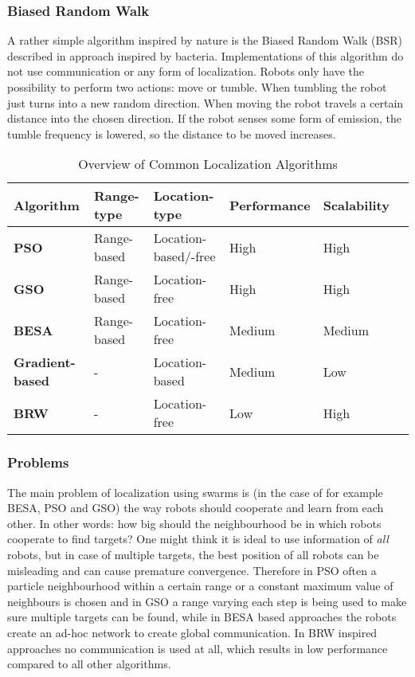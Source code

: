 	\subsubsection{Biased Random Walk}
		A rather simple algorithm inspired by nature is the Biased Random Walk (BSR) described in \cite{dhariwal2004bacterium} approach inspired by bacteria. 
		Implementations of this algorithm do not use communication or any form of localization. 
		Robots only have the possibility to perform two actions: move or tumble. 
		When tumbling the robot just turns into a new random direction. 
		When moving the robot travels a certain distance into the chosen direction. 
		If the robot senses some form of emission, the tumble frequency is lowered, so the distance to be moved increases.

	\begin{table}[H]
  \renewcommand{\arraystretch}{1.3}
  \caption{Overview of Common Localization Algorithms}
  \label{table_alg_localization}
  \centering
    \begin{tabular}{|l|l|l|l|l|l|}
    \hline
    \bfseries Algorithm & Range-type & Location-type & Performance & Scalability\\
    \hline
    \bfseries PSO & Range-based & Location-based/-free & High & High\\
    \hline
    \bfseries GSO & Range-based & Location-free & High & High\\
    \hline
    \bfseries BESA & Range-based & Location-free & Medium & Medium\\
    \hline
    \bfseries Gradient-based & - & Location-based & Medium & Low\\
    \hline
    \bfseries BRW & - & Location-free & Low & High\\
    \hline
    \end{tabular}
  \end{table}

	\subsubsection{Problems}
	The main problem of localization using swarms is (in the case of for example BESA, PSO and GSO) the way robots should cooperate and learn from each other. In other words: how big should the neighbourhood be in which robots cooperate to find targets? One might think it is ideal to use information of \emph{all} robots, but in case of multiple targets, the best position of all robots can be misleading and can cause premature convergence. Therefore in PSO often a particle neighbourhood within a certain range or a constant maximum value of neighbours is chosen and in GSO a range varying each step is being used to make sure multiple targets can be found, while in BESA based approaches the robots create an ad-hoc network to create global communication. In BRW inspired approaches no communication is used at all, which results in low performance compared to all other algorithms.

